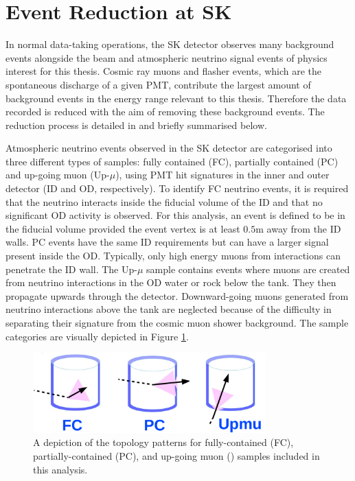 \section{Event Reduction at SK}
\label{sec:Simulations_Reduction}

In normal data-taking operations, the SK detector observes many background events alongside the beam and atmospheric neutrino signal events of physics interest for this thesis. Cosmic ray muons and flasher events, which are the spontaneous discharge of a given PMT, contribute the largest amount of background events in the energy range relevant to this thesis.
Therefore the data recorded is reduced with the aim of removing these background events. The reduction process is detailed in \cite{Ashie_2005, Jiang2019-iw} and briefly summarised below.

Atmospheric neutrino events observed in the SK detector are categorised into three different types of samples: fully contained (FC), partially contained (PC) and up-going muon (Up-$\mu$), using PMT hit signatures in the inner and outer detector (ID and OD, respectively). To identify FC neutrino events, it is required that the neutrino interacts inside the fiducial volume of the ID and that no significant OD activity is observed. For this analysis, an event is defined to be in the fiducial volume provided the event vertex is at least $0.5$m away from the ID walls. PC events have the same ID requirements but can have a larger signal present inside the OD. Typically, only high energy muons from \quickmath{\nu_{\mu}} interactions can penetrate the ID wall. The Up-$\mu$ sample contains events where muons are created from neutrino interactions in the OD water or rock below the tank. They then propagate upwards through the detector. Downward-going muons generated from neutrino interactions above the tank are neglected because of the difficulty in separating their signature from the cosmic muon shower background. The sample categories are visually depicted in Figure \ref{fig:Simulations_AtmosphericSampleTopology}.

\begin{figure}[ht!]
    \centering
    \includegraphics[width=0.8\textwidth]{Figures/Simulations/Atmo_topology.pdf}
    \caption{A depiction of the topology patterns for fully-contained (FC), partially-contained (PC), and up-going muon () samples included in this analysis.}
    \label{fig:Simulations_AtmosphericSampleTopology}
\end{figure}

